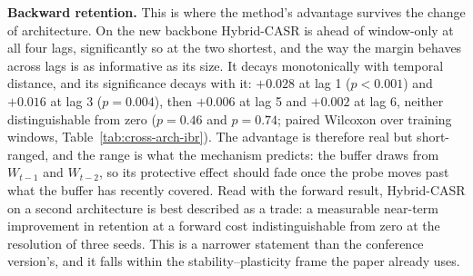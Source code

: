 \begin{table}[t]
  \centering
  \caption{Immediate Backward Retention across backbones. Decay $=(\mathrm{IBR@1}-\mathrm{IBR@6})/\mathrm{IBR@1}$. Absolute levels are not comparable with Table~\ref{tab:retention-detailed} (see text).}
  \label{tab:cross-arch-ibr}
\end{table}

\textbf{Backward retention.} This is where the method's advantage survives the change of architecture. On the new backbone Hybrid-CASR is ahead of window-only at all four lags, significantly so at the two shortest, and the way the margin behaves across lags is as informative as its size. It decays monotonically with temporal distance, and its significance decays with it: $+0.028$ at lag 1 ($p<0.001$) and $+0.016$ at lag 3 ($p=0.004$), then $+0.006$ at lag 5 and $+0.002$ at lag 6, neither distinguishable from zero ($p=0.46$ and $p=0.74$; paired Wilcoxon over training windows, Table~\ref{tab:cross-arch-ibr}). The advantage is therefore real but short-ranged, and the range is what the mechanism predicts: the buffer draws from $W_{t-1}$ and $W_{t-2}$, so its protective effect should fade once the probe moves past what the buffer has recently covered. Read with the forward result, Hybrid-CASR on a second architecture is best described as a trade: a measurable near-term improvement in retention at a forward cost indistinguishable from zero at the resolution of three seeds. This is a narrower statement than the conference version's, and it falls within the stability--plasticity frame the paper already uses.

